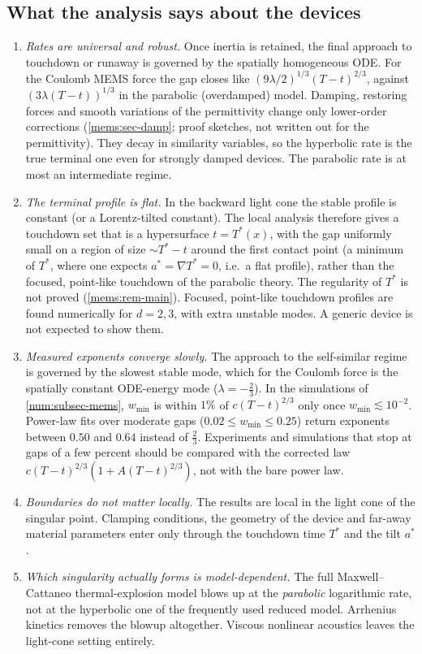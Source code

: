 \subsection{What the analysis says about the devices}
\begin{enumerate}[leftmargin=1.5em]
\item \emph{Rates are universal and robust.} Once inertia is retained, the
final approach to touchdown or runaway is governed by the spatially
homogeneous ODE. For the Coulomb MEMS force the gap closes like
$(9\lambda/2)^{1/3}(T-t)^{2/3}$, against $(3\lambda(T-t))^{1/3}$ in the
parabolic (overdamped) model. Damping, restoring forces and smooth variations
of the permittivity change only lower-order corrections (\cref{mems:sec-damp};
proof sketches, not written out for the permittivity). They decay in
similarity variables, so the hyperbolic rate is the true terminal one even
for strongly damped devices. The parabolic rate is at most an intermediate
regime.
\item \emph{The terminal profile is flat.} In the backward light cone the
stable profile is constant (or a Lorentz-tilted constant). The local
analysis therefore gives a touchdown set that is a hypersurface $t=T^*(x)$,
with the gap uniformly small on a region of size $\sim T^*-t$ around the
first contact point (a minimum of $T^*$, where one expects $a^*=\nabla T^*=0$,
i.e.\ a flat profile), rather than the focused, point-like touchdown of the parabolic theory. The
regularity of $T^*$ is not proved (\cref{mems:rem-main}). Focused, point-like touchdown
profiles are found numerically for $d=2,3$, with extra unstable modes. A generic device is not expected
to show them.
\item \emph{Measured exponents converge slowly.} The approach to the
self-similar regime is governed by the slowest stable mode, which for the
Coulomb force is the spatially constant ODE-energy mode ($\lambda=-\frac23$). In
the simulations of \cref{num:subsec-mems}, $w_{\min}$ is within $1\%$ of
$c(T-t)^{2/3}$ only once $w_{\min}\lesssim10^{-2}$. Power-law fits over moderate
gaps ($0.02\le w_{\min}\le0.25$) return exponents between $0.50$ and $0.64$
instead of $\frac23$. Experiments and simulations that stop at gaps of a
few percent should be compared with the corrected law
$c(T-t)^{2/3}(1+A(T-t)^{2/3})$, not with the bare power law.
\item \emph{Boundaries do not matter locally.} The results are local in the
light cone of the singular point. Clamping conditions, the geometry of the
device and far-away material parameters enter only through the touchdown
time $T^*$ and the tilt $a^*$.
\item \emph{Which singularity actually forms is model-dependent.} The full
Maxwell--Cattaneo thermal-explosion model blows up at the \emph{parabolic}
logarithmic rate, not at the hyperbolic one of the frequently used reduced
model. Arrhenius kinetics removes the blowup altogether. Viscous nonlinear
acoustics leaves the light-cone setting entirely.
\end{enumerate}


